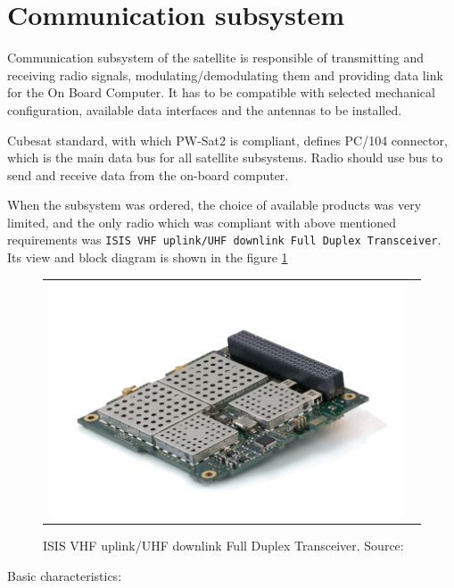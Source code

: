 \section{Communication subsystem}
Communication subsystem of the satellite is responsible of transmitting and receiving radio signals, modulating/demodulating them and providing data link for the On Board Computer. It has to be compatible with selected mechanical configuration, available data interfaces and the antennas to be installed.

Cubesat standard, with which PW-Sat2 is compliant, defines PC/104 connector, which is the main data bus for all satellite subsystems. Radio should use \iic bus to send and receive data from the on-board computer.

When the subsystem was ordered, the choice of available products was very limited, and the only radio which was compliant with above mentioned requirements was \texttt{ISIS VHF uplink/UHF downlink Full Duplex Transceiver}. Its view and block diagram is shown in the figure \ref{ISIS_TRXvU}

\begin{figure}
   \centering
\begin{tabular}{cc}
        \includegraphics[width=0.4\paperwidth]{img/2/ISIS-radio-UHF-VHF-min.png}
    & 
\end{tabular}
\label{ISIS_TRXvU}
\caption{ISIS VHF uplink/UHF downlink Full Duplex Transceiver. Source: \cite{???}}
\end{figure}

Basic characteristics:

